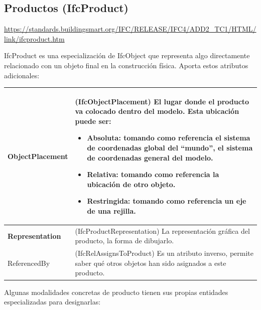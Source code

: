 \documentclass[spanish,12pt,a4paper,final,oneside]{book}
\begin{document}
\vspace{0.5cm}



\subsection{Productos (IfcProduct)}
\url{https://standards.buildingsmart.org/IFC/RELEASE/IFC4/ADD2_TC1/HTML/link/ifcproduct.htm}

IfcProduct es una especialización de IfcObject que representa algo directamente relacionado con un objeto final en la construcción física. Aporta estos atributos adicionales:

\begin{longtable}{|p{2.5cm} p{11cm}|}
\hline

\textbf{ObjectPlacement} & (IfcObjectPlacement) El lugar donde el producto va colocado dentro del modelo. Esta ubicación puede ser:
\begin{itemize}
\item Absoluta: tomando como referencia el sistema de coordenadas global del ``mundo'', el sistema de coordenadas general del modelo. 
\item Relativa: tomando como referencia la ubicación de otro objeto.
\item Restringida: tomando como referencia un eje de una rejilla.
\end{itemize}
\\[0.1cm] \hline

\textbf{Representation} & (IfcProductRepresentation) La representación gráfica del producto, la forma de dibujarlo.
\\[0.1cm] \hline

ReferencedBy & (IfcRelAssignsToProduct) Es un atributo inverso, permite saber qué otros objetos han sido asignados a este producto.
\\[0.1cm] \hline

\end{longtable}

\vspace{0.3cm}
Algunas modalidades concretas de producto tienen sus propias entidades especializadas para designarlas:
\end{document}
